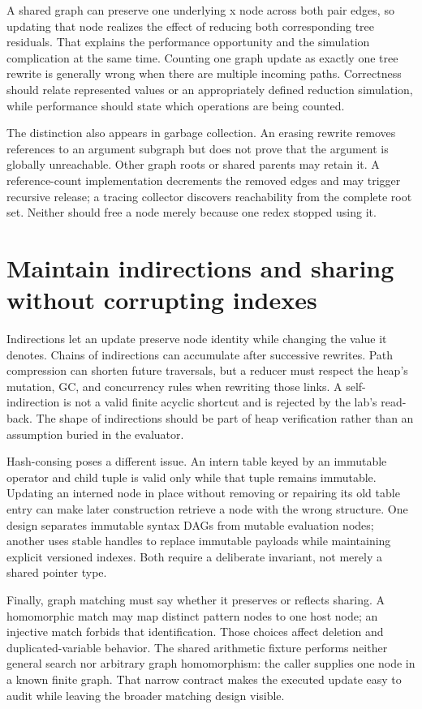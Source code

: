 A shared graph can preserve one underlying x node across both pair edges, so updating that node realizes the effect of reducing both corresponding tree residuals.
That explains the performance opportunity and the simulation complication at the same time.
Counting one graph update as exactly one tree rewrite is generally wrong when there are multiple incoming paths.
Correctness should relate represented values or an appropriately defined reduction simulation, while performance should state which operations are being counted.

The distinction also appears in garbage collection.
An erasing rewrite removes references to an argument subgraph but does not prove that the argument is globally unreachable.
Other graph roots or shared parents may retain it.
A reference-count implementation decrements the removed edges and may trigger recursive release; a tracing collector discovers reachability from the complete root set.
Neither should free a node merely because one redex stopped using it.

\section{Maintain indirections and sharing without corrupting indexes}
\label{sec:ch86-indirections}
Indirections let an update preserve node identity while changing the value it denotes.
Chains of indirections can accumulate after successive rewrites.
Path compression can shorten future traversals, but a reducer must respect the heap's mutation, GC, and concurrency rules when rewriting those links.
A self-indirection is not a valid finite acyclic shortcut and is rejected by the lab's read-back.
The shape of indirections should be part of heap verification rather than an assumption buried in the evaluator.

Hash-consing poses a different issue.
An intern table keyed by an immutable operator and child tuple is valid only while that tuple remains immutable.
Updating an interned node in place without removing or repairing its old table entry can make later construction retrieve a node with the wrong structure.
One design separates immutable syntax DAGs from mutable evaluation nodes; another uses stable handles to replace immutable payloads while maintaining explicit versioned indexes.
Both require a deliberate invariant, not merely a shared pointer type.

Finally, graph matching must say whether it preserves or reflects sharing.
A homomorphic match may map distinct pattern nodes to one host node; an injective match forbids that identification.
Those choices affect deletion and duplicated-variable behavior.
The shared arithmetic fixture performs neither general search nor arbitrary graph homomorphism: the caller supplies one node in a known finite graph.
That narrow contract makes the executed update easy to audit while leaving the broader matching design visible.

